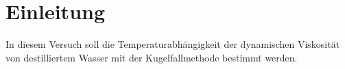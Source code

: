 
\section{Einleitung}

In diesem Versuch soll die Temperaturabhängigkeit der dynamischen
Viskosität von destilliertem Wasser mit der Kugelfallmethode bestimmt
werden.
